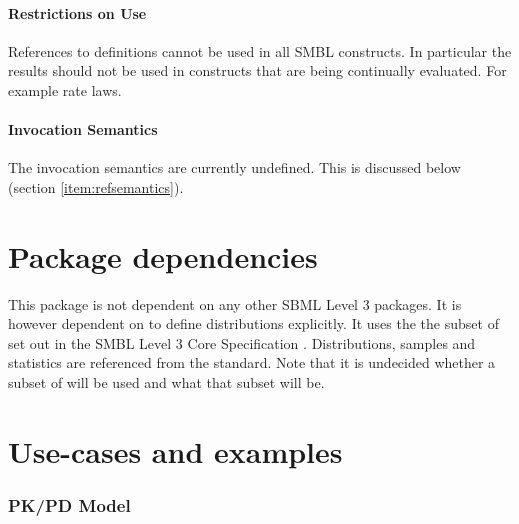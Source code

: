 \documentclass[draftspec]{sbmlpkgspec}
\begin{document}
\paragraph{Restrictions on Use}

References to definitions cannot be used in all SMBL constructs. In
particular the results should not be used in constructs that are being continually
evaluated. For example rate laws.

\paragraph{Invocation Semantics}

The invocation semantics are currently undefined. This is discussed below
(section \vref{item:refsemantics}).

\section{Package dependencies}

This package is not dependent on any other SBML Level 3 packages. It
is however dependent on \mathml \cite{mathml2} to define distributions
explicitly. It uses the the subset of \mathml set out in the SMBL
Level 3 Core Specification \cite{l3v1c}. Distributions, samples and
statistics are referenced from the \uncertml standard. Note
\contraversial that it is undecided whether a subset of  \uncertml will
be used and what that subset will be.

\section{Use-cases and examples}

\subsubsection{PK/PD Model}
\end{document}
